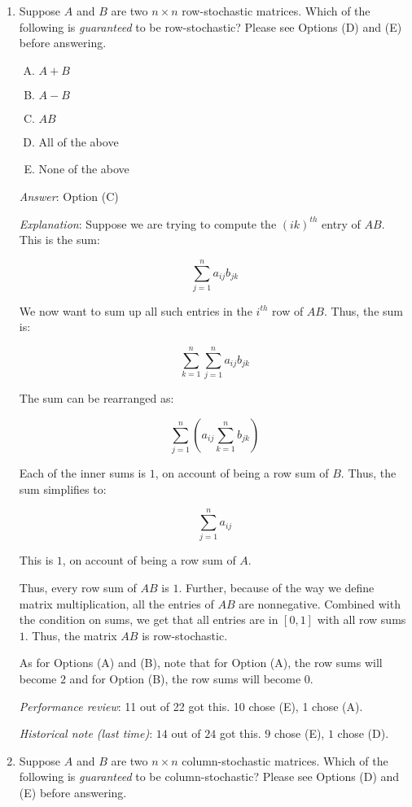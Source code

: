 \documentclass[10pt]{amsart}
\begin{document}
\begin{enumerate}

\item Suppose $A$ and $B$ are two $n \times n$ row-stochastic
  matrices. Which of the following is {\em guaranteed} to be
  row-stochastic? Please see Options (D) and (E) before answering.

  \begin{enumerate}[(A)]
  \item $A + B$
  \item $A - B$
  \item $AB$
  \item All of the above
  \item None of the above
  \end{enumerate}

  {\em Answer}: Option (C)

  {\em Explanation}: Suppose we are trying to compute the $(ik)^{th}$
  entry of $AB$. This is the sum:

  $$\sum_{j=1}^n a_{ij}b_{jk}$$

  We now want to sum up all such entries in the $i^{th}$ row of
  $AB$. Thus, the sum is:

  $$\sum_{k=1}^n \sum_{j=1}^n a_{ij}b_{jk}$$

  The sum can be rearranged as:

  $$\sum_{j=1}^n \left(a_{ij} \sum_{k=1}^n b_{jk}\right)$$

  Each of the inner sums is $1$, on account of being a row sum of
  $B$. Thus, the sum simplifies to:

  $$\sum_{j=1}^n a_{ij}$$

  This is $1$, on account of being a row sum of $A$.

  Thus, every row sum of $AB$ is $1$. Further, because of the way we
  define matrix multiplication, all the entries of $AB$ are
  nonnegative. Combined with the condition on sums, we get that all
  entries are in $[0,1]$ with all row sums $1$. Thus, the matrix $AB$
  is row-stochastic.

  As for Options (A) and (B), note that for Option (A), the row sums
  will become $2$ and for Option (B), the row sums will become $0$.

  {\em Performance review}: 11 out of 22 got this. 10 chose (E), 1 chose (A).

  {\em Historical note (last time)}: $14$ out of $24$ got this. $9$ chose (E),
  $1$ chose (D).

\item Suppose $A$ and $B$ are two $n \times n$ column-stochastic
  matrices. Which of the following is {\em guaranteed} to be
  column-stochastic? Please see Options (D) and (E) before answering.


\end{enumerate}
\end{document}
